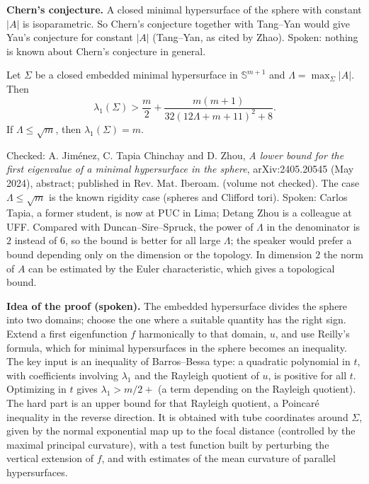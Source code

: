 \medskip\noindent
{\bf Chern's conjecture.} A closed minimal
hypersurface of the sphere with constant
$|A|$ is isoparametric. So Chern's
conjecture together with Tang--Yan would
give Yau's conjecture for constant $|A|$
(Tang--Yan, as cited by Zhao). Spoken:
nothing is known about Chern's conjecture
in general.

\begin{theorem}
\label{theorem-jimenez-tapia-zhou}
Let $\Sigma$ be a closed embedded minimal
hypersurface in $\mathbb{S}^{m+1}$ and
$\Lambda = \max_\Sigma |A|$. Then
$$
\lambda_1(\Sigma) > \frac{m}{2}
+ \frac{m(m+1)}{32(12\Lambda+m+11)^2+8}.
$$
If $\Lambda \le \sqrt{m}$, then
$\lambda_1(\Sigma) = m$.
\end{theorem}

\noindent
Checked: A. Jim\'enez, C. Tapia Chinchay and
D. Zhou, \emph{A lower bound for the first
eigenvalue of a minimal hypersurface in the
sphere}, arXiv:2405.20545 (May 2024),
abstract; published in Rev. Mat.
Iberoam. (volume not checked). The case
$\Lambda \le \sqrt{m}$ is the known
rigidity case (spheres and Clifford tori).
Spoken: Carlos Tapia, a former student, is
now at PUC in Lima; Detang Zhou is a
colleague at UFF. Compared with
Duncan--Sire--Spruck, the power of
$\Lambda$ in the denominator is $2$ instead
of $6$, so the bound is better for all
large $\Lambda$; the speaker would prefer a
bound depending only on the dimension or the
topology. In dimension $2$ the norm of $A$
can be estimated by the Euler
characteristic, which gives a topological
bound.

\medskip\noindent
{\bf Idea of the proof (spoken).} The
embedded hypersurface divides the sphere
into two domains; choose the one where a
suitable quantity has the right sign. Extend
a first eigenfunction $f$ harmonically to
that domain, $u$, and use Reilly's formula,
which for minimal hypersurfaces in the
sphere becomes an inequality. The key input
is an inequality of Barros--Bessa type: a
quadratic polynomial in $t$, with
coefficients involving $\lambda_1$ and the
Rayleigh quotient of $u$, is positive for
all $t$. Optimizing in $t$ gives
$\lambda_1 > m/2 + {}$ (a term depending on
the Rayleigh quotient). The hard part is an
upper bound for that Rayleigh quotient, a
Poincar\'e inequality in the reverse
direction. It is obtained with tube
coordinates around $\Sigma$, given by the
normal exponential map up to the focal
distance (controlled by the maximal
principal curvature), with a test function
built by perturbing the vertical extension
of $f$, and with estimates of the mean
curvature of parallel hypersurfaces.

